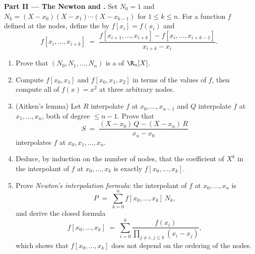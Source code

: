 \begin{problem}
\medskip
\noindent\textbf{Part II --- The Newton  and .} Set $N_0 = 1$ and $N_k = (X - x_0)(X - x_1) \cdots
(X - x_{k-1})$ for $1 \leq k \leq n$. For a function $f$ defined
at the nodes, define the \emph{} by
$f[x_i] = f(x_i)$ and
\[
f[x_i, \dots, x_{i+k}] \;=\;
\frac{f[x_{i+1}, \dots, x_{i+k}] - f[x_i, \dots, x_{i+k-1}]}
{x_{i+k} - x_i} .
\]
\begin{enumerate}[resume]
  \item Prove that $(N_0, N_1, \dots, N_n)$ is a  of
        $\R_n[X]$.
  \item Compute $f[x_0, x_1]$ and $f[x_0, x_1, x_2]$ in terms of
        the values of $f$, then compute all  of
        $f(x) = x^2$ at three arbitrary nodes.
  \item (Aitken's lemma) Let $R$ interpolate $f$ at $x_0, \dots,
        x_{n-1}$ and $Q$ interpolate $f$ at $x_1, \dots, x_n$,
        both of degree $\leq n - 1$. Prove that
        \[
        S \;=\; \frac{(X - x_0)\,Q - (X - x_n)\,R}{x_n - x_0}
        \]
        interpolates $f$ at $x_0, x_1, \dots, x_n$.
  \item Deduce, by induction on the number of nodes, that the
        coefficient of $X^{k}$ in the interpolant of $f$ at $x_0,
        \dots, x_k$ is exactly $f[x_0, \dots, x_k]$.
  \item Prove \emph{Newton's interpolation formula}: the
        interpolant of $f$ at $x_0, \dots, x_n$ is
        \[
        P \;=\; \sum_{k=0}^{n} f[x_0, \dots, x_k]\, N_k ,
        \]
        and derive the closed formula
        \[
        f[x_0, \dots, x_k] \;=\; \sum_{i=0}^{k}
        \frac{f(x_i)}{\prod_{j \neq i,\, j \leq k} (x_i - x_j)} ,
        \]
        which shows that $f[x_0, \dots, x_k]$ does not depend on
        the ordering of the nodes.
\end{enumerate}


\end{problem}
